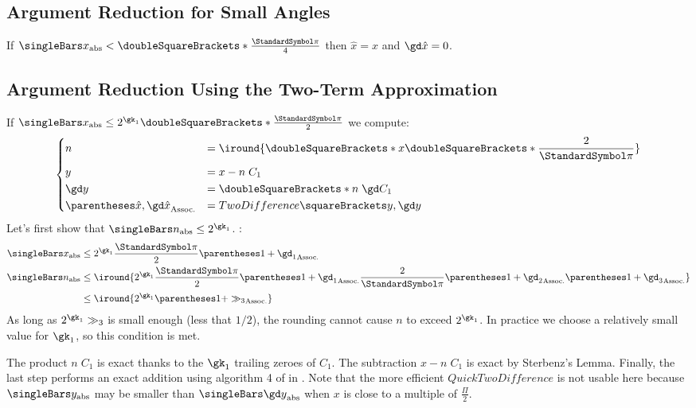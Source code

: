 \documentclass[10pt, a4paper, twoside]{basestyle}
\newcommand{\round}[1]{\doubleSquareBrackets*{#1}}
\begin{document}
\subsection*{Argument Reduction for Small Angles}
If $\abs x < \round{\frac{\Pi}{4}}$ then $\hat x = x$ and $\gd \hat x = 0$.
\subsection*{Argument Reduction Using the Two-Term Approximation}
If $\abs x \leq 2^{\gk_1} \round{\frac{\Pi}{2}}$ we compute:
\[
\begin{dcases}
n &= \iround{\round{x \round{\frac{2}{\Pi}}}} \\
y &= x - n \; C_1 \\
\gd y &= \round{n \; \gd C_1} \\
\pa{\hat x, \gd \hat x} &= TwoDifference\of{y, \gd y}
\end{dcases}
\]
Let's first show that $\abs n \leq 2^{\gk_1}$. :
\begin{align*}
\abs x &\leq 2^{\gk_1} \frac{\Pi}{2} \pa{1 + \gd_1} \\
\abs n &\leq \iround{2^{\gk_1} \frac{\Pi}{2} \pa{1 + \gd_1} \frac{2}{\Pi} \pa{1 + \gd_2} \pa{1 + \gd_3}} \\
&\leq \iround{2^{\gk_1} \pa{1 + \gg_3}}
\end{align*}
As long as $2^{\gk_1} \gg_3$ is small enough (less that $1/2$), the rounding cannot cause $n$ to exceed $2^{\gk_1}$.  In practice we choose a relatively small value for $\gk_1$, so this condition is met.

The product $n \; C_1$ is exact thanks to the $\gk_1$ trailing zeroes of $C_1$.  The subtraction $x - n \; C_1$ is exact by Sterbenz's Lemma.  Finally, the last step performs an exact addition using algorithm 4 of in \cite{HidaLiBailey2007}.  Note that the more efficient $QuickTwoDifference$ is not usable here because $\abs y$ may be smaller than $\abs{\gd y}$ when $x$ is close to a multiple of $\frac{\Pi}{2}$.
\end{document}
